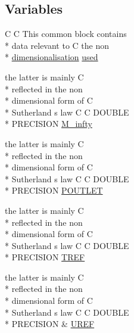 \subsection*{Variables}
\begin{DoxyCompactItemize}
\item 
C C This common block contains \\*
data relevant to C the non \\*
\hyperlink{ioplasma_8com_a400563a4c7d85c3c04db2d7e198c44a3}{dimensionalisation} \hyperlink{msa20_2home_2abonfi_2_c_f_d__codes_2_eul_f_s_83_82_83_2include_2stream_8com_a3291a21585d0aec360cd82d75bf51496}{used}
\item 
the latter is mainly C \\*
reflected in the non \\*
dimensional form of C \\*
Sutherland s law C C D\-O\-U\-B\-L\-E \\*
P\-R\-E\-C\-I\-S\-I\-O\-N \hyperlink{msa20_2home_2abonfi_2_c_f_d__codes_2_eul_f_s_83_82_83_2include_2stream_8com_a57c765efd76d44669f6966962bda2d72}{M\-\_\-infty}
\item 
the latter is mainly C \\*
reflected in the non \\*
dimensional form of C \\*
Sutherland s law C C D\-O\-U\-B\-L\-E \\*
P\-R\-E\-C\-I\-S\-I\-O\-N \hyperlink{msa20_2home_2abonfi_2_c_f_d__codes_2_eul_f_s_83_82_83_2include_2stream_8com_a42c20c83e2242ab14c0d4178f49679c8}{P\-O\-U\-T\-L\-E\-T}
\item 
the latter is mainly C \\*
reflected in the non \\*
dimensional form of C \\*
Sutherland s law C C D\-O\-U\-B\-L\-E \\*
P\-R\-E\-C\-I\-S\-I\-O\-N \hyperlink{msa20_2home_2abonfi_2_c_f_d__codes_2_eul_f_s_83_82_83_2include_2stream_8com_a8c4a60ca1b033fbd4e2cadaf15146ca5}{T\-R\-E\-F}
\item 
the latter is mainly C \\*
reflected in the non \\*
dimensional form of C \\*
Sutherland s law C C D\-O\-U\-B\-L\-E \\*
P\-R\-E\-C\-I\-S\-I\-O\-N \& \hyperlink{msa20_2home_2abonfi_2_c_f_d__codes_2_eul_f_s_83_82_83_2include_2stream_8com_ab0954e3210109eba37b309fef6a66996}{U\-R\-E\-F}

\end{DoxyCompactItemize}
